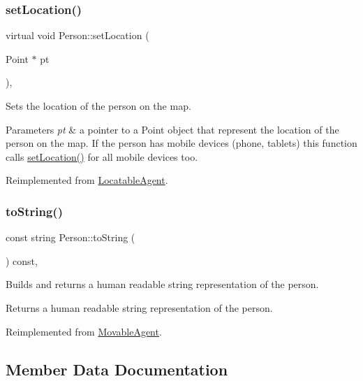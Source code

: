 \subsubsection{\texorpdfstring{set\+Location()}{setLocation()}}
{\footnotesize\ttfamily virtual void Person\+::set\+Location (\begin{DoxyParamCaption}\item[{Point $\ast$}]{pt }\end{DoxyParamCaption})\hspace{0.3cm}{\ttfamily [override]}, {\ttfamily [virtual]}}

Sets the location of the person on the map. 
\begin{DoxyParams}{Parameters}
{\em pt} & a pointer to a Point object that represent the location of the person on the map. If the person has mobile devices (phone, tablets) this function calls \hyperlink{class_person_a05f4ac2107d59e03f0f336eda08aa358}{set\+Location()} for all mobile devices too. \\
\hline
\end{DoxyParams}


Reimplemented from \hyperlink{class_locatable_agent_a754b237c404b77714fedd397f214bc02}{Locatable\+Agent}.

\mbox{\label{class_person_a68872538da519d0a04297f43376db27c}} 
\subsubsection{\texorpdfstring{to\+String()}{toString()}}
{\footnotesize\ttfamily const string Person\+::to\+String (\begin{DoxyParamCaption}{ }\end{DoxyParamCaption}) const\hspace{0.3cm}{\ttfamily [override]}, {\ttfamily [virtual]}}

Builds and returns a human readable string representation of the person. \begin{DoxyReturn}{Returns}
a human readable string representation of the person. 
\end{DoxyReturn}


Reimplemented from \hyperlink{class_movable_agent_a1dee2a6bf93f01006fadfb6fba6c9a59}{Movable\+Agent}.



\subsection{Member Data Documentation}
\mbox{\label{class_person_a743e071da10a5ac9150f61df919cfbb4}} 
